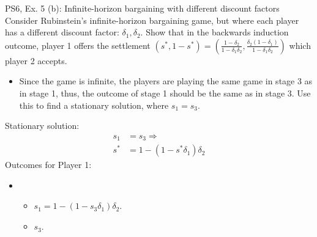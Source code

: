\begin{frame}{PS6, Ex. 5 (b): Infinite-horizon bargaining with different discount factors}
    Consider Rubinstein's infinite-horizon bargaining game, but where each player has a different discount factor: $\delta_1,\delta_2$. Show that in the backwards induction outcome, player 1 offers the settlement
    $(s^{*},1-s^{*})=\left( \frac{1-\delta_2}{1-\delta_1\delta_2},\frac{\delta_2(1-\delta_1)}{1-\delta_1\delta_2}\right)$
    which player 2 accepts.
    \begin{itemize}
      \item[(Step b)] Since the game is infinite, the players are playing the same game in stage 3 as in stage 1, thus, the outcome of stage 1 should be the same as in stage 3. Use this to find a stationary solution, where $s_{1}=s_{3}$.
    \end{itemize}
  \begin{multicols}{2}
    Stationary solution:
    \begin{align*}
          s_1&= s_3 \Rightarrow\\
        s^{*}&= 1- (1-s^{*}\delta_1)\delta_2
    \end{align*}
    \vfill\null \columnbreak
    Outcomes for Player 1:
    \begin{itemize}
        \item[]\vspace{-8pt}
            \begin{itemize}\normalsize
              \item[Stage 1:] $s_1 = 1-(1-s_3\delta_1)\delta_2$.
              \item[Stage 3:] $s_3$.
            \end{itemize}
    \end{itemize}
    \vfill\null
  \end{multicols}
    \vfill\null
\end{frame}
